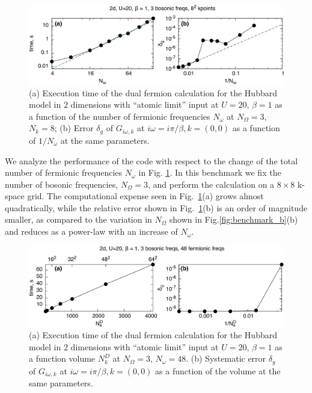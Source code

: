\documentclass[3p,times,procedia]{elsarticle}
\begin{document}
\begin{figure}[ht]
\includegraphics[width=1.0\columnwidth]{time_ffreqs.pdf}
\caption{(a) Execution time of the dual fermion calculation for the Hubbard model in $2$ dimensions with ``atomic limit'' input at $U=20$, $\beta = 1$ as a function of the number of fermionic frequencies $N_{\omega}$ at $N_{\Omega} = 3$, $N_k = 8$; (b) Error $\delta_g$ of $G_{i\omega, k}$ at $i\omega = i\pi / \beta, k = (0,0)$ as a function of $1/N_{\omega}$ at the same parameters.}
\label{fig:benchmark_f}
\end{figure}

We analyze the performance of the code with respect to the change of the total number of fermionic frequencies $N_{\omega}$  in Fig. \ref{fig:benchmark_f}.  In this benchmark we fix the number of bosonic frequencies, $N_{\Omega}=3$, and perform the calculation on a $8\times8$ k-space grid. The computational expense seen in Fig.~\ref{fig:benchmark_f}(a) grows almost quadratically, while the relative error shown in Fig.~\ref{fig:benchmark_f}(b) is an order of magnitude smaller, as compared to the variation in $N_{\Omega}$ shown in Fig.\ref{fig:benchmark_b}(b) and reduces as a power-law with an increase of $N_{\omega}$.

\begin{figure}[ht]
\includegraphics[width=1.0\columnwidth]{time_kpts.pdf}
\caption{(a) Execution time of the dual fermion calculation for the Hubbard model in $2$ dimensions with ``atomic limit'' input at $U=20$, $\beta = 1$ as a function volume $N_k^D$ at $N_{\Omega} = 3$, $N_{\omega} = 48$. (b) Systematic error $\delta_g$ of $G_{i\omega, k}$ at $i\omega = i\pi / \beta, k = (0,0)$ as a function of the volume at the same parameters.}
\label{fig:benchmark_kpts}
\end{figure}
\end{document}
